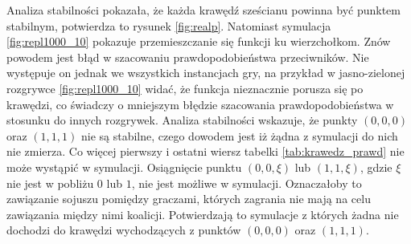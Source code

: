 Analiza stabilności pokazała, że każda krawędź sześcianu powinna być punktem stabilnym, potwierdza to rysunek \ref{fig:realp}. Natomiast symulacja \ref{fig:repl1000_10} pokazuje przemieszczanie się funkcji ku wierzchołkom. Znów powodem jest błąd w szacowaniu prawdopodobieństwa przeciwników. Nie występuje on jednak we wszystkich instancjach gry, na przykład w jasno-zielonej rozgrywce \ref{fig:repl1000_10} widać, że funkcja nieznacznie porusza się po krawędzi, co świadczy o mniejszym błędzie szacowania prawdopodobieństwa w stosunku do innych rozgrywek. Analiza stabilności wskazuje, że punkty $(0,0,0)$ oraz $(1,1,1)$ nie są stabilne, czego dowodem jest iż żądna z symulacji do nich nie zmierza. Co więcej pierwszy i ostatni wiersz tabelki \ref{tab:krawedz_prawd} nie może wystąpić w symulacji. Osiągnięcie punktu $(0,0,\xi )$ lub $(1,1,\xi )$, gdzie $\xi$ nie jest w pobliżu $0$ lub $1$, nie jest możliwe w symulacji. Oznaczałoby to zawiązanie sojuszu pomiędzy graczami, których zagrania nie mają na celu zawiązania między nimi koalicji. Potwierdzają to symulacje z których żadna nie dochodzi do krawędzi wychodzących z punktów $(0,0,0)$ oraz $(1,1,1)$.

